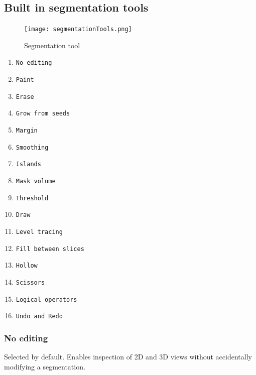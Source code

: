 \subsection{Built in segmentation tools}
\begin{figure}[h!]
	\centerline{
		\texttt{[image: segmentationTools.png]}}
	\caption{Segmentation tool}\label{fig:sT}
\end{figure}
\pagebreak
\begin{enumerate}
	\item \texttt{No editing}
	\item \texttt{Paint}
	\item \texttt{Erase}
	\item \texttt{Grow from seeds}
	\item \texttt{Margin}
	\item \texttt{Smoothing}
	\item \texttt{Islands}
	\item \texttt{Mask volume}
	\item \texttt{Threshold}
	\item \texttt{Draw}
	\item \texttt{Level tracing}
	\item \texttt{Fill between slices}
	\item \texttt{Hollow}
	\item \texttt{Scissors}
	\item \texttt{Logical operators}
	\item \texttt{Undo and Redo}
\end{enumerate}

\subsubsection{No editing}
Selected by default. Enables inspection of 2D and 3D views without accidentally modifying a segmentation.
\pagebreak

